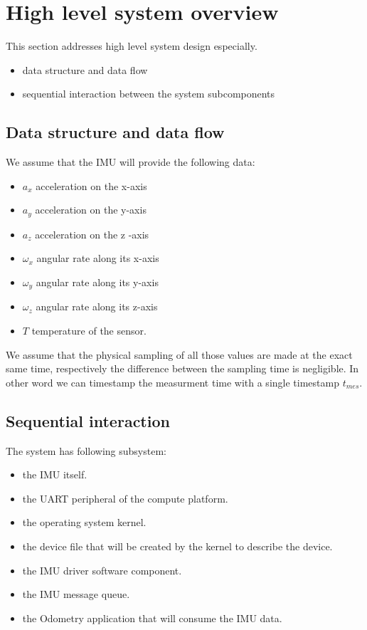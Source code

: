 \section{High level system overview}
This section addresses high level system design especially.
\begin{itemize}
    \item data structure and data flow
    \item sequential interaction between the system subcomponents
\end{itemize}

\subsection{Data structure and data flow}
We assume that the IMU will provide the following data:
\begin{itemize}
    \item $a_x$ acceleration on the x-axis
    \item $a_y$ acceleration on the y-axis
    \item $a_z$ acceleration on the z -axis
    \item $\omega_x$ angular rate along its x-axis
    \item $\omega_y$ angular rate along its y-axis
    \item $\omega_z$ angular rate along its z-axis
    \item $T$ temperature of the sensor.
\end{itemize}
We assume that the physical sampling of all those values are made at the exact same time, respectively the difference between the sampling time is negligible.
In other word we can timestamp the measurment time with a single timestamp $t_{mes}$.

\subsection{Sequential interaction}
The system has following subsystem:
\begin{itemize}
    \item the IMU itself.
    \item the UART peripheral of the compute platform.
    \item the operating system kernel.
    \item the device file that will be created by the kernel to describe the device.
    \item the IMU driver software component.
    \item the IMU message queue.
    \item the Odometry application that will consume the IMU data.
\end{itemize}


